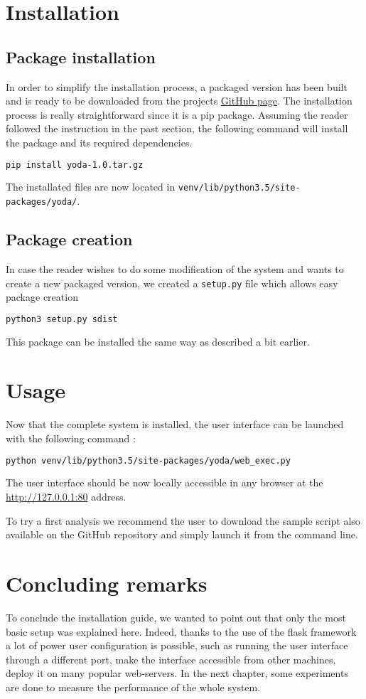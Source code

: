 \section{Installation}
\subsection{Package installation}
In order to simplify the installation process, a packaged version has been built and is ready to be downloaded from the projects \href{https://github.com/dchenaux/Yoda}{GitHub page}. The installation process is really straightforward since it is a \gls{pip} package. Assuming the reader followed the instruction in the past section, the following command will install the package and its required dependencies. 
\smallskip
\begin{lstlisting}[language=bash]
pip install yoda-1.0.tar.gz
\end{lstlisting}

The installated files are now located in \texttt{venv/lib/python3.5/site-packages/yoda/}.

\subsection{Package creation}
In case the reader wishes to do some modification of the system and wants to create a new packaged version, we created a \texttt{setup.py} file which allows easy package creation
\smallskip
\begin{lstlisting}[language=bash]
python3 setup.py sdist
\end{lstlisting}

This package can be installed the same way as described a bit earlier.

\section{Usage}
Now that the complete system is installed, the user interface can be launched with the following command :
\smallskip
\begin{lstlisting}[language=bash]
python venv/lib/python3.5/site-packages/yoda/web_exec.py
\end{lstlisting}
The user interface should be now locally accessible in any browser at the \url{http://127.0.0.1:80} address.

To try a first analysis we recommend the user to download the sample script also available on the GitHub repository and simply launch it from the command line.

\section{Concluding remarks}
To conclude the installation guide, we wanted to point out that only the most basic setup was explained here. Indeed, thanks to the use of the flask framework a lot of power user configuration is possible, such as running the user interface through a different port, make the interface accessible from other machines, deploy it on many popular web-servers. In the next chapter, some experiments are done to measure the performance of the whole system.
